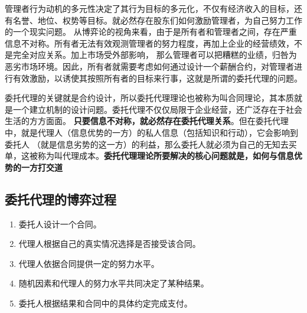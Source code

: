 \documentclass[12pt, a4paper]{article} %
\begin{document}
\begin{CJK*}{UTF8}{gbsn}
        管理者行为动机的多元性决定了其行为目标的多元化，不仅有经济收入的目标，还有名誉、地位、权势等目标。就必然存在股东们如何激励管理者，为自己努力工作的一个现实问题。
        从博弈论的视角来看，由于是所有者和管理者之间，存在严重信息不对称。所有者无法有效观测管理者的努力程度，再加上企业的经营绩效，不是完全对应关系。加上市场受外部影响，
        那么管理者可以把糟糕的业绩，归咎为恶劣市场环境。因此，所有者就需要考虑如何通过设计一个薪酬合约，对管理者进行有效激励，以诱使其按照所有者的目标来行事，这就是所谓的委托代理的问题。\par

        委托代理的关键就是合约设计，所以委托代理理论也被称为叫合同理论，其本质就是一个建立机制的设计问题。委托代理不仅仅局限于企业经营，还广泛存在于社会生活的方方面面。
        \textbf{只要信息不对称，就必然存在委托代理关系}。但在委托代理中，就是代理人（信息优势的一方）的私人信息（包括知识和行动），它会影响到委托人
        （就是信息劣势的这一方）的利益，那么委托人就必须为自己的无知去买单，这被称为叫代理成本。\textbf{委托代理理论所要解决的核心问题就是，如何与信息优势的一方打交道}\par

        \subsection{委托代理的博弈过程}
        \begin{enumerate}
            \item 委托人设计一个合同。
            \item 代理人根据自己的真实情况选择是否接受该合同。
            \item 代理人依据合同提供一定的努力水平。
            \item 随机因素和代理人的努力水平共同决定了某种结果。
            \item 委托人根据结果和合同中的具体约定完成支付。
        \end{enumerate}


\end{CJK*}
\end{document}
